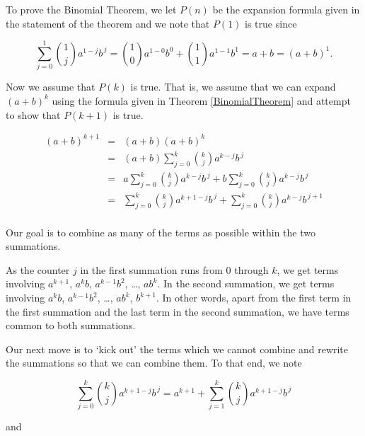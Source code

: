 \documentclass{ximera}
\begin{document}
\medskip

To prove the Binomial Theorem, we let $P(n)$ be the expansion formula given in the statement of the theorem and we note that $P(1)$ is true since


\[ \displaystyle{\sum_{j=0}^{1} \binom{1}{j} a^{1-j} b^{\, j}} =  \displaystyle{\binom{1}{0}a^{1-0}b^{0} +  \binom{1}{1}a^{1-1}b^{1}} = a+b = (a+b)^{1}. \]



Now we assume that $P(k)$ is true.  That is, we assume that we can expand $(a+b)^k$ using the formula given in Theorem \ref{BinomialTheorem}  and attempt to show that $P(k+1)$ is true.

\[ \begin{array}{rcl}

(a+b)^{k+1} & = & (a+b)(a+b)^{k} \\ [15pt]
            & = & (a+b) \displaystyle{\sum_{j=0}^{k} \binom{k}{j} a^{k-j} b^{\, j}}  \\ [15pt]
            & = & a \displaystyle{\sum_{j=0}^{k} \binom{k}{j} a^{k-j} b^{\, j}} +  b \displaystyle{\sum_{j=0}^{k} \binom{k}{j} a^{k-j} b^{\, j}} \\ [15pt]
            & = & \displaystyle{\sum_{j=0}^{k} \binom{k}{j} a^{k+1-j} b^{\, j}} +  \displaystyle{\sum_{j=0}^{k} \binom{k}{j} a^{k-j} b^{\, j+1}} \\ [15pt]           
            
\end{array} \]

Our goal is to combine as many of the terms as possible within the two summations. 

\smallskip

As the counter $j$ in the first summation runs from $0$ through $k$, we get terms involving $a^{k+1}$, $a^{k}b$, $a^{k-1}b^2$, \ldots, $ab^{k}$.   In the second summation,   we get terms involving $a^{k}b$, $a^{k-1}b^{2}$, \ldots, $ab^{k}$, $b^{k+1}$.  In other words, apart from the first term in the first summation and the last term in the second summation, we have terms common to both summations. 

\smallskip

Our next move is to `kick out' the terms which we cannot combine and rewrite the summations so that we can combine them.  To that end, we note

\[ \displaystyle{\sum_{j=0}^{k} \binom{k}{j} a^{k+1-j} b^{\, j} = a^{k+1}+ \sum_{j=1}^{k} \binom{k}{j} a^{k+1-j} b^{\, j}}\]

and
\end{document}
